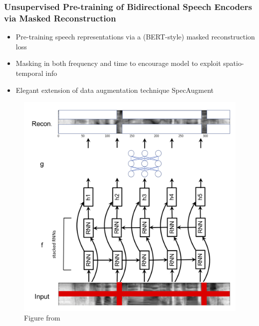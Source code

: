 \documentclass[table]{beamer}
\begin{document}
\begin{frame}
\frametitle{Unsupervised Pre-training of Bidirectional Speech Encoders via Masked Reconstruction}

		\begin{itemize}
			\item Pre-training speech representations via a (BERT-style) masked reconstruction loss  \citep{wang2020unsupervised}
			\item Masking in both frequency and time to encourage model to exploit spatio-temporal info
			\item Elegant extension of data augmentation technique SpecAugment \citep{Park_2019}
		\end{itemize}	
			\begin{figure}
			\centering
			\includegraphics[scale=0.18]	{wang2020} 
			\caption{Figure from  \citep{wang2020unsupervised}}
			\end{figure}


\end{frame}
\end{document}
